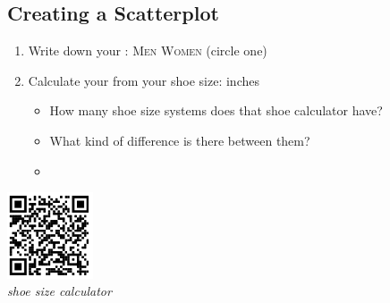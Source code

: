 \documentclass[12pt,letterpaper]{memoir}
\begin{document}
\pagestyle{plain}
\checkandfixthelayout
\raggedbottom


\subsection*{Creating a Scatterplot}

\begin{minipage}{0.7\textwidth}
\begin{enumerate}[fullwidth,label={\Large$\bm{\square}$}\,\arabic*.]
    \item Write down your : \underline{\hspace{0.5in}} 
        {\scshape Men}
        \quad 
        {\scshape Women} (circle one)
    \item Calculate your  from your shoe size: 
            \underline{\hspace{0.5in}} inches
        \begin{itemize}
            \item How many shoe size systems does that shoe calculator have?
                \underline{\hspace{0.5in}}
            \item What kind of difference is there between them?
                \hrulefill 
            \item[] \hrulefill
        \end{itemize}
\end{enumerate}
\end{minipage}
\begin{minipage}{0.25\textwidth}
    \begin{center}
        \includegraphics[width=1in]{QR-shoe-size-conversion}\\
        {\small\itshape shoe size calculator}
    \end{center}
\end{minipage}
\end{document}
